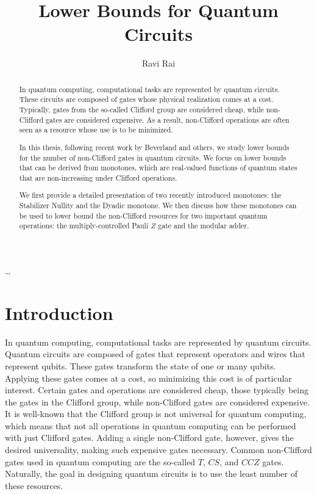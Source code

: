 \documentclass[12pt]{dalthesis}
\begin{document}
\title{Lower Bounds for Quantum Circuits}
\author{Ravi Rai}
\mcs
{}

\nolistoftables
\nolistoffigures

\frontmatter

\begin{abstract}
In quantum computing, computational tasks are represented by quantum circuits. These circuits are composed of gates whose physical realization comes at a cost. Typically, gates from the so-called Clifford group are considered cheap, while non-Clifford gates are considered expensive. As a result, non-Clifford operations are often seen as a resource whose use is to be minimized.

In this thesis, following recent work by Beverland and others, we study lower bounds for the number of non-Clifford gates in quantum circuits. We focus on lower bounds that can be derived from monotones, which are real-valued functions of quantum states that are non-increasing under Clifford operations.

We first provide a detailed presentation of two recently introduced monotones: the Stabilizer Nullity and the Dyadic monotone. We then discuss how these monotones can be used to lower bound the non-Clifford resources for two important quantum operations: the multiply-controlled Pauli $Z$ gate and the modular adder.
\end{abstract}

\begin{acknowledgements}
\ldots
\end{acknowledgements}

\mainmatter

\chapter{Introduction}

In quantum computing, computational tasks are represented by quantum circuits. Quantum circuits are composed of gates that represent operators and wires that represent qubits. These gates transform the state of one or many qubits. Applying these gates comes at a cost, so minimizing this cost is of particular interest. Certain gates and operations are considered cheap, those typically being the gates in the Clifford group, while non-Clifford gates are considered expensive. It is well-known that the Clifford group is not universal for quantum computing, which means that not all operations in quantum computing can be performed with just Clifford gates. Adding a single non-Clifford gate, however, gives the desired universality, making such expensive gates necessary. Common non-Clifford gates used in quantum computing are the so-called $T$, $CS$, and $CCZ$ gates. Naturally, the goal in designing quantum circuits is to use the least number of these resources.
\end{document}
